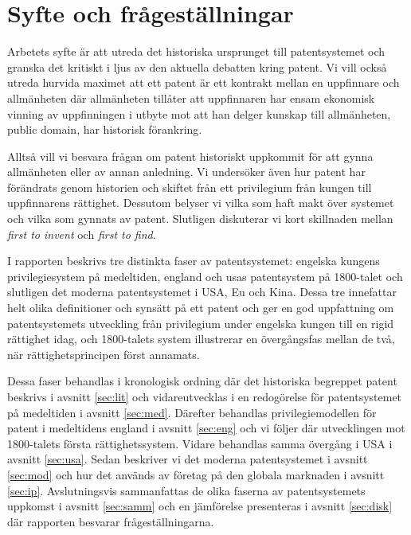 \section{Syfte och frågeställningar}

Arbetets syfte är att utreda det historiska ursprunget till patentsystemet och
granska det kritiskt i ljus av den aktuella debatten kring patent.
Vi vill också utreda hurvida maximet att ett patent är ett kontrakt mellan en
uppfinnare och allmänheten där allmänheten tillåter att uppfinnaren har ensam
ekonomisk vinning av uppfinningen i utbyte mot att han delger kunskap till
allmänheten, public domain, har historisk förankring.

Alltså vill vi besvara frågan om patent historiskt uppkommit för att gynna
allmänheten eller av annan anledning. Vi undersöker även hur patent har förändrats genom historien och skiftet från ett privilegium från kungen till uppfinnarens rättighet.
Dessutom belyser vi vilka som haft makt över systemet och vilka som gynnats av patent.
Slutligen diskuterar vi kort skillnaden mellan \emph{first to invent} och \emph{first to find}.
 
I rapporten beskrivs tre distinkta faser av patentsystemet: engelska kungens privilegiesystem på medeltiden, england och usas patentsystem på 1800-talet och slutligen det moderna patentsystemet i USA, Eu och Kina. Dessa tre innefattar helt olika definitioner och synsätt på ett patent och ger en god uppfattning om patentsystemets utveckling från privilegium under engelska kungen till en rigid rättighet idag, och 1800-talets system illustrerar en övergångsfas mellan de två, när rättighetsprincipen först annamats. 

Dessa faser behandlas i kronologisk ordning där det historiska begreppet patent beskrivs i avsnitt \ref{sec:lit} och vidareutvecklas i en redogörelse för patentsystemet på medeltiden i avsnitt \ref{sec:med}. Därefter behandlas privilegiemodellen för patent i medeltidens england i avsnitt \ref{sec:eng} och vi följer där utvecklingen mot 1800-talets första rättighetssystem. Vidare behandlas samma övergång i USA i avsnitt \ref{sec:usa}. Sedan beskriver vi det moderna patentsystemet i avsnitt \ref{sec:mod} och hur det används av företag på den globala marknaden i avsnitt \ref{sec:ip}. Avslutningsvis sammanfattas de olika faserna av patentsystemets uppkomst i avsnitt \ref{sec:samm} och en jämförelse presenteras i avsnitt \ref{sec:disk} där rapporten besvarar frågeställningarna.
 

